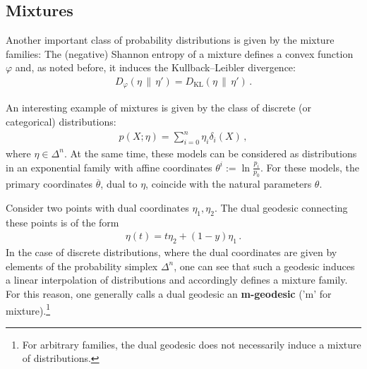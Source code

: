 \subsection{Mixtures}

    Another important class of probability distributions is given by the mixture families:
    The (negative) Shannon entropy of a mixture defines a convex function $\varphi$ and, as noted before, it induces the Kullback--Leibler divergence:
    \begin{gather}
        D_\varphi(\eta\,\|\,\eta') = D_{\text{KL}}(\eta\,\|\,\eta')\,.
    \end{gather}

    \begin{example}
        An interesting example of mixtures is given by the class of discrete (or categorical) distributions:
        \begin{gather}
            p(X;\eta) = \sum_{i=0}^n\eta_i\delta_i(X)\,,
        \end{gather}
        where $\eta\in\Delta^n$. At the same time, these models can be considered as distributions in an exponential family with affine coordinates $\theta^i:=\ln\frac{p_i}{p_0}$. For these models, the primary coordinates $\overline{\theta}$, dual to $\eta$, coincide with the natural parameters $\theta$.
    \end{example}

    Consider two points with dual coordinates $\eta_1,\eta_2$. The dual geodesic connecting these points is of the form
    \begin{gather}
        \eta(t) = t\eta_2 + (1-y)\eta_1\,.
    \end{gather}
    In the case of discrete distributions, where the dual coordinates are given by elements of the probability simplex $\Delta^n$, one can see that such a geodesic induces a linear interpolation of distributions and accordingly defines a mixture family. For this reason, one generally calls a dual geodesic an \textbf{m-geodesic} ('m' for mixture).\footnote{For arbitrary families, the dual geodesic does not necessarily induce a mixture of distributions.}

